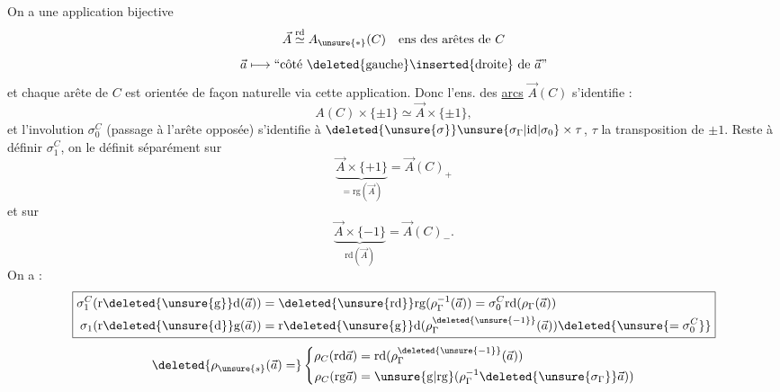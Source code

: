 On a une application bijective
\[
\vec A\overset{\mathrm{rd}}{\simeq}A_{\unsure{*}}(C)\quad\text{ens des arêtes de }C
\]
\[
\vec a\longmapsto\text{``côté \deleted{gauche}\inserted{droite} de $\vec a$''}
\]
et chaque arête de $C$ est orientée de façon naturelle via cette application. Donc l'ens. des \uline{arcs} $\vec A(C)$ s'identifie :
\[
A(C)\times\{\pm1\}\simeq\vec A\times\{\pm1\},
\]
et l'involution $\sigma_0^C$ (passage à l'arête opposée) s'identifie à $\deleted{\unsure{\sigma}}\unsure{\sigma_\Gamma|\mathrm{id}|\sigma_0}\times\tau$, $\tau$ la transposition de $\pm1$. Reste à définir $\sigma_1^C$, on le définit séparément sur
\[
\underbrace{\vec A\times\{+1\}}_{=\mathrm{rg}(\vec A)}=\vec A(C)_+
\]
et sur
\[
\underbrace{\vec A\times\{-1\}}_{\mathrm{rd}(\vec A)}=\vec A(C)_-.
\]
On a :
\[
\boxed{\begin{aligned}
\sigma_1^C(\mathrm r\deleted{\unsure{\mathrm g}}\mathrm d(\vec a))&=\deleted{\unsure{\mathrm{rd}}}\mathrm{rg}(\rho_\Gamma^{-1}(\vec a))=\sigma_0^C\mathrm{rd}(\rho_\Gamma(\vec a))\\
\sigma_1(\mathrm r\deleted{\unsure{\mathrm d}}\mathrm g(\vec a))&=\mathrm r\deleted{\unsure{\mathrm g}}\mathrm d(\rho_\Gamma^{\deleted{\unsure{-1}}}(\vec a))\deleted{\unsure{=\sigma_0^C}}
\end{aligned}}
\]
\[
\deleted{\rho_{\unsure{s}}(\vec a)=}
\left\{\begin{aligned}
\rho_C(\mathrm{rd}\vec a)&=\mathrm{rd}(\rho_\Gamma^{\deleted{\unsure{-1}}}(\vec a))\\
\rho_C(\mathrm{rg}\vec a)&=\unsure{\mathrm g|\mathrm{rg}}(\rho_\Gamma^{-1}\deleted{\unsure{\sigma_\Gamma}}\vec a))
\end{aligned}\right.
\]

